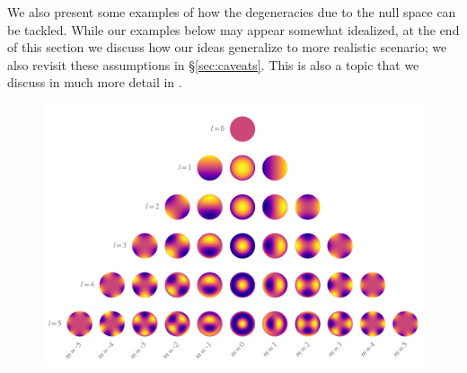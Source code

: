 \documentclass[modern]{aastex62}
\begin{document}
We also present some examples of how the degeneracies due to
the null space can be tackled.
While our examples below may appear somewhat idealized, at the end
of this section we discuss how our ideas generalize to more
realistic scenario; we also revisit these assumptions in \S\ref{sec:caveats}.
This is also a topic that we discuss in much more detail in .

\begin{figure}[t!]
    \begin{centering}
        \includegraphics[width=\linewidth]{figures/ylms.pdf}
    \end{centering}
\end{figure}
\end{document}
